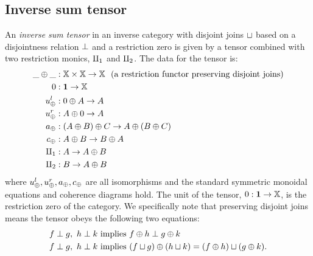 \subsection{Inverse sum tensor} %
\label{sub:inverse_sum_tensor}
\begin{definition}\label{def:inverse_sum_tensor}
  An \emph{inverse sum tensor} in an inverse category \X with disjoint joins $\sqcup$ based
  on a disjointness relation $\perp$ and a restriction zero
  is given by a tensor combined with two restriction monics, $\amalg_{1}$ and $\amalg_{2}$. The data for the
  tensor is:
 \begin{align*}
    \_ \oplus \_ &: \mathbb{X} \times \mathbb{X} \to \mathbb{X}\ \ \text{(a restriction functor preserving disjoint joins)}\\
    0 &: \boldsymbol{1}\to \mathbb{X} \\
    u_{\oplus}^l &: 0 \oplus A \to A\\
    u_{\oplus}^r &: A \oplus 0 \to A\\
    a_\oplus &: (A \oplus B) \oplus C \to A \oplus (B \oplus C) \\
    c_\oplus &: A \oplus B \to B \oplus A\\
    \amalg_{1} &: A \to A \oplus B\\
    \amalg_{2} &: B \to A \oplus B
  \end{align*}
  where $u_{\oplus}^l, u_{\oplus}^r, a_\oplus, c_\oplus$ are all isomorphisms and the standard symmetric monoidal
  equations and coherence diagrams hold. The unit of the tensor, $0: \boldsymbol{1}\to \mathbb{X}$, is the
  restriction zero of the category. We specifically note that preserving disjoint joins means the
  tensor obeys the following two equations:
  \begin{align}
    f \perp g, \ h \perp k&\text{ implies } f\oplus h \perp g \oplus k
    \label{eq:invsum_preserve_perp}\\
    f \perp g, \ h \perp k &\text{ implies } (f\sqcup g)\oplus(h\sqcup k) = (f \oplus h )\sqcup (g\oplus k).
    \label{eq:invsum_preserve_join}
  \end{align}

\end{definition}


